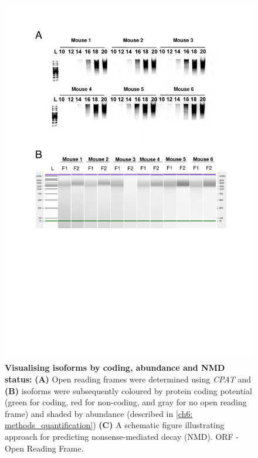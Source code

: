 \begin{figure}[htp]
	\centering
	\includegraphics[page=8,trim={0cm 1cm 0cm 0cm},clip,scale = 0.75]{Figures/TargetedTranscriptome_LabResults}
	\captionsetup{width=0.95\textwidth,singlelinecheck=off}
	\caption[Visualising isoforms by coding, abundance and NMD status]%
	{\textbf{Visualising isoforms by coding, abundance and NMD status:} \textbf{(A)} Open reading frames were determined using \textit{CPAT} and \textbf{(B)} isoforms were subsequently coloured by protein coding potential (green for coding, red for non-coding, and gray for no open reading frame) and shaded by abundance (described in \cref{ch6: methods_quantification}) \textbf{(C)} A schematic figure illustrating approach for predicting nonsense-mediated decay (NMD). ORF - Open Reading Frame. 
	}
	\label{fig:Targeted_isoforms_cpat}
\end{figure}

